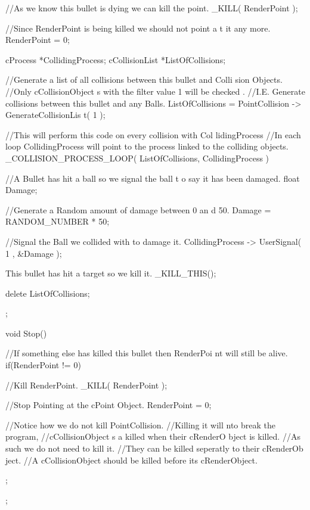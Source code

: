 \begin{DoxyCode}
{{{                        //As we know this bullet is dying we can kill the point.
                                _KILL( RenderPoint );

                        //Since RenderPoint is being killed we should not point a
      t it any more.
                                RenderPoint = 0;
                }

                cProcess *CollidingProcess;
                cCollisionList *ListOfCollisions;

                //Generate a list of all collisions between this bullet and Colli
      sion Objects.
                //Only cCollisionObject s with the filter value 1 will be checked
      .
                //I.E. Generate collisions between this bullet and any Balls.
                        ListOfCollisions = PointCollision -> GenerateCollisionLis
      t( 1 );

                        //This will perform this code on every collision with Col
      lidingProcess
                        //In each loop CollidingProcess will point to the process
       linked to the colliding objects.
                _COLLISION_PROCESS_LOOP( ListOfCollisions, CollidingProcess )
                {
                                //A Bullet has hit a ball so we signal the ball t
      o say it has been damaged.
                        float Damage;

                                //Generate a Random amount of damage between 0 an
      d 50.
                        Damage = RANDOM_NUMBER * 50;

                                //Signal the Ball we collided with to damage it.
                        CollidingProcess -> UserSignal( 1 , &Damage );

                                This bullet has hit a target so we kill it.
                        _KILL_THIS();
                }

                delete ListOfCollisions;
   };

   void Stop()
   {
                        //If something else has killed this bullet then RenderPoi
      nt will still be alive.
                if(RenderPoint != 0)
                {
                                //Kill RenderPoint.
                        _KILL( RenderPoint );

                                //Stop Pointing at the cPoint Object.
                        RenderPoint = 0;

                                //Notice how we do not kill PointCollision.
                                //Killing it will nto break the program,
                                //cCollisionObject s a killed when their cRenderO
      bject is killed.
                                //As such we do not need to kill it.
                                //They can be killed seperatly to their cRenderOb
      ject.
                                //A cCollisionObject should be killed before its 
      cRenderObject.
                }
   };
};


\end{DoxyCode}
